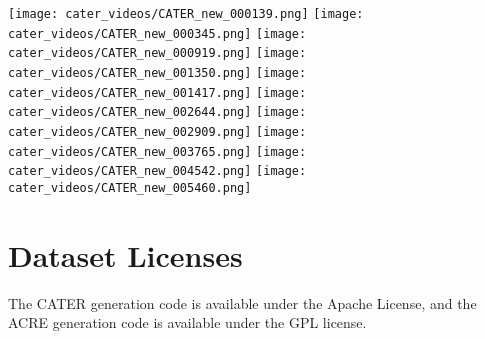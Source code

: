 \documentclass{article}
\begin{document}
\texttt{[image: cater\_videos/CATER\_new\_000139.png]}
\texttt{[image: cater\_videos/CATER\_new\_000345.png]}
\texttt{[image: cater\_videos/CATER\_new\_000919.png]}
\texttt{[image: cater\_videos/CATER\_new\_001350.png]}
\texttt{[image: cater\_videos/CATER\_new\_001417.png]}
\texttt{[image: cater\_videos/CATER\_new\_002644.png]}
\texttt{[image: cater\_videos/CATER\_new\_002909.png]}
\texttt{[image: cater\_videos/CATER\_new\_003765.png]}
\texttt{[image: cater\_videos/CATER\_new\_004542.png]}
\texttt{[image: cater\_videos/CATER\_new\_005460.png]}

\section{Dataset Licenses}
The CATER generation code is available under the Apache License, and the ACRE generation code is available under the GPL license.
\end{document}
